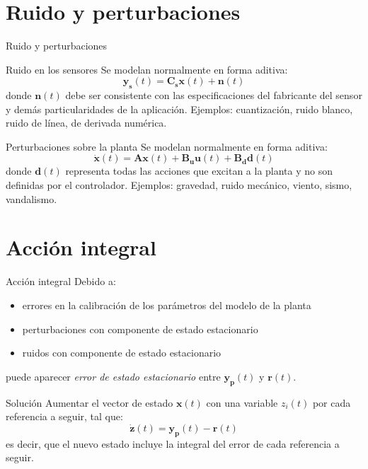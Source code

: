 \documentclass{beamer}
\begin{document}
\section{Ruido y perturbaciones} 
\tableofcontents[currentsection]
\begin{frame}{Ruido y perturbaciones}
\begin{block}{Ruido en los sensores}
    Se modelan normalmente en forma aditiva:
    $$\mathbf{y_s}(t) = \mathbf{C_s}\mathbf{x}(t) + \mathbf{n}(t)$$
    donde $\mathbf{n}(t)$ debe ser consistente con las especificaciones del fabricante del sensor y demás particularidades de la aplicación. Ejemplos: cuantización, ruido blanco, ruido de línea, de derivada numérica.
\end{block}

\begin{block}{Perturbaciones sobre la planta}
    Se modelan normalmente en forma aditiva:
    $$\mathbf{\dot{x}}(t) = \mathbf{A} \mathbf{x}(t) + \mathbf{B_u} \mathbf{u}(t) + \mathbf{B_d} \mathbf{d}(t)$$
    donde $\mathbf{d}(t)$ representa todas las acciones que excitan a la planta y no son definidas por el controlador. Ejemplos: gravedad, ruido mecánico, viento, sismo, vandalismo.
\end{block}

\end{frame}

\section{Acción integral} 
\tableofcontents[currentsection]
\begin{frame}{Acción integral}
Debido a:
\begin{itemize}
    \item errores en la calibración de los parámetros del modelo de la planta
    \item perturbaciones con componente de estado estacionario
    \item ruidos con componente de estado estacionario
\end{itemize}
puede aparecer \emph{error de estado estacionario} entre $\mathbf{y_p}(t)$ y $\mathbf{r}(t)$.

\begin{block}{Solución}
    Aumentar el vector de estado $\mathbf{x}(t)$ con una variable $z_i(t)$ por cada referencia a seguir, tal que:
    $$\dot{\mathbf{z}}(t) = \mathbf{y_p}(t) - \mathbf{r}(t)$$
    es decir, que el nuevo estado incluye la integral del error de cada referencia a seguir.
\end{block}
\end{frame}
\end{document}
